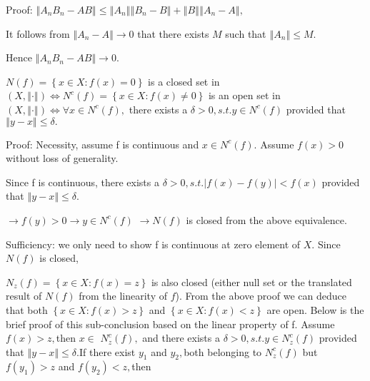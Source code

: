 \documentclass{article}
\begin{document}
Proof: $\left\Vert A_{n}B_{n}-AB\right\Vert \leq \left\Vert A_{n}\right\Vert
\left\Vert B_{n}-B\right\Vert +\left\Vert B\right\Vert \left\Vert
A_{n}-A\right\Vert ,$

It follows from $\left\Vert A_{n}-A\right\Vert \rightarrow 0$ that there
exists $M$ such that $\left\Vert A_{n}\right\Vert \leq M.$

Hence $\left\Vert A_{n}B_{n}-AB\right\Vert \rightarrow 0.$


$N\left( f\right) =\left\{ x\in X:f\left( x\right) =0\right\} $ is a closed
set in $\left( X,\left\Vert \cdot \right\Vert \right) \iff N^{c}\left(
f\right) =\left\{ x\in X:f\left( x\right) \neq 0\right\} $ is an open set in 
$\left( X,\left\Vert \cdot \right\Vert \right) \iff \forall x\in N^{c}\left(
f\right) ,$ there exists a $\delta >0,s.t.y\in N^{c}\left( f\right) $
provided that $\left\Vert y-x\right\Vert \leq \delta .$

Proof: Necessity, assume f is continuous and $x\in N^{c}\left( f\right) .$%
Assume $f\left( x\right) >0$ without loss of generality.

Since f is continuous, there exists a $\delta >0,s.t.\left\vert f\left(
x\right) -f\left( y\right) \right\vert <f\left( x\right) $ provided that $%
\left\Vert y-x\right\Vert \leq \delta .$

$\rightarrow f\left( y\right) >0\rightarrow y\in N^{c}\left( f\right) $ $%
\rightarrow N\left( f\right) $ is closed from the above equivalence.

Sufficiency: we only need to show f is continuous at zero element of $X.$
Since $N\left( f\right) $ is closed,

$N_{z}\left( f\right) =\left\{ x\in X:f\left( x\right) =z\right\} $ is also
closed (either null set or the translated result of  $N\left( f\right) $
from the linearity of $f$). From the above proof we can deduce that both $%
\left\{ x\in X:f\left( x\right) >z\right\} $ and $\left\{ x\in X:f\left(
x\right) <z\right\} $ are open. Below is the brief proof of this
sub-conclusion based on the linear property of f. Assume $f\left( x\right)
>z,$then $x\in $ $N_{z}^{c}\left( f\right) ,$ and there exists a $\delta
>0,s.t.y\in N_{z}^{c}\left( f\right) $ provided that $\left\Vert
y-x\right\Vert \leq \delta .$If there exist $y_{1}$ and $y_{2},$both
belonging to $N_{z}^{c}\left( f\right) $ but $f\left( y_{1}\right) >z$ and $%
f\left( y_{2}\right) <z,$then
\end{document}
